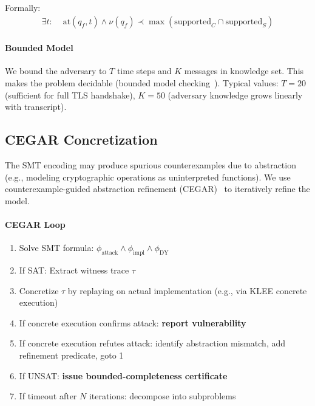 \documentclass[10pt,twocolumn]{article}
\begin{document}
Formally:
\begin{align}
\exists t: &\text{ at}(q_f, t) \land \nu(q_f) \prec \max(\text{supported}_C \cap \text{supported}_S)
\end{align}

\paragraph{Bounded Model}
We bound the adversary to $T$ time steps and $K$ messages in knowledge set. This makes the problem decidable (bounded model checking~\cite{clarke2001bmc}). Typical values: $T = 20$ (sufficient for full TLS handshake), $K = 50$ (adversary knowledge grows linearly with transcript).

\subsection{CEGAR Concretization}
\label{sec:cegar}

The SMT encoding may produce spurious counterexamples due to abstraction (e.g., modeling cryptographic operations as uninterpreted functions). We use counterexample-guided abstraction refinement (CEGAR)~\cite{clarke2000counterexample} to iteratively refine the model.

\paragraph{CEGAR Loop}
\begin{enumerate}[leftmargin=*,noitemsep]
\item Solve SMT formula: $\phi_{\text{attack}} \land \phi_{\text{impl}} \land \phi_{\text{DY}}$
\item If SAT: Extract witness trace $\tau$
\item Concretize $\tau$ by replaying on actual implementation (e.g., via KLEE concrete execution)
\item If concrete execution confirms attack: \textbf{report vulnerability}
\item If concrete execution refutes attack: identify abstraction mismatch, add refinement predicate, goto 1
\item If UNSAT: \textbf{issue bounded-completeness certificate}
\item If timeout after $N$ iterations: decompose into subproblems
\end{enumerate}
\end{document}
